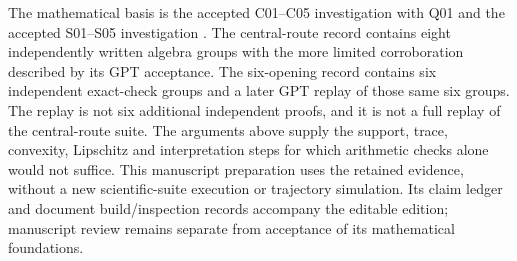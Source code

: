 The mathematical basis is the accepted C01--C05 investigation with Q01 and the accepted S01--S05 investigation \cite{CR,SO}. The central-route record contains eight independently written algebra groups with the more limited corroboration described by its GPT acceptance. The six-opening record contains six independent exact-check groups and a later GPT replay of those same six groups. The replay is not six additional independent proofs, and it is not a full replay of the central-route suite. The arguments above supply the support, trace, convexity, Lipschitz and interpretation steps for which arithmetic checks alone would not suffice. This manuscript preparation uses the retained evidence, without a new scientific-suite execution or trajectory simulation. Its claim ledger and document build/inspection records accompany the editable edition; manuscript review remains separate from acceptance of its mathematical foundations.
